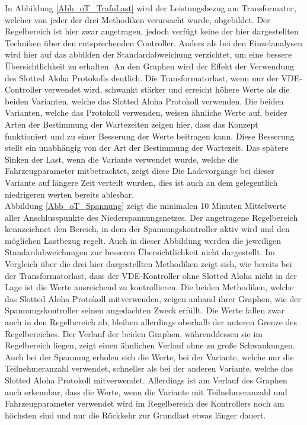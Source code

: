 In Abbildung \ref{Abb_oT_TrafoLast} wird der Leistungsbezug am Transformator, welcher von jeder der drei Methodiken verursacht wurde, abgebildet. Der Regelbereich ist hier zwar angetragen, jedoch verfügt keine der hier dargestellten Techniken über den entsprechenden Controller. Anders als bei den Einzelanalysen wird hier auf das abbilden der Standardabweichung verzichtet, um eine bessere Übersichtlichkeit zu erhalten. An den Graphen wird der Effekt der Verwendung des Slotted Aloha Protokolls deutlich. Die Transformatorlast, wenn nur der VDE-Controller verwendet wird, schwankt stärker und erreicht höhere Werte als die beiden Varianten, welche das Slotted Aloha Protokoll verwenden. Die beiden Varianten, welche das Protokoll verwenden, weisen ähnliche Werte auf, beider Arten der Bestimmung der Wartezeiten zeigen hier, dass das Konzept funktioniert und zu einer Besserung der Werte beitragen kann. Diese Besserung stellt ein unabhängig von der Art der Bestimmung der Wartezeit. Das spätere Sinken der Last, wenn die Variante verwendet wurde, welche die Fahrzeugparameter mitbetrachtet, zeigt diese Die Ladevorgänge bei dieser Variante auf längere Zeit verteilt wurden, dies ist auch an dem gelegentlich niedrigeren werten bereits ablesbar.\\
Abbildung \ref{Abb_oT_Spannung} zeigt die minimalen 10 Minuten Mittelwerte aller Anschlusspunkte des Niederspannungsnetzes. Der angetragene Regelbereich kennzeichnet den Bereich, in dem der Spannungskontroller aktiv wird und den möglichen Lastbezug regelt. Auch in dieser Abbildung werden die jeweiligen Standardabweichungen zur besseren Übersichtlichkeit nicht dargestellt. Im Vergleich über die drei hier dargestellten Methodiken zeigt sich, wie bereits bei der Transformatorlast, dass der VDE-Kontroller ohne Slotted Aloha nicht in der Lage ist die Werte ausreichend zu kontrollieren. Die beiden Methodiken, welche das Slotted Aloha Protokoll mitverwenden, zeigen anhand ihrer Graphen, wie der Spannungskontroller seinen angedachten Zweck erfüllt. Die Werte fallen zwar auch in den Regelbereich ab, bleiben allerdings oberhalb der unteren Grenze des Regelbereiches. Der Verlauf der beiden Graphen, währenddessen sie im Regelbereich liegen, zeigt einen ähnlichen Verlauf ohne zu große Schwankungen. Auch bei der Spannung erholen sich die Werte, bei der Variante, welche nur die Teilnehmeranzahl verwendet, schneller als bei der anderen Variante, welche das Slotted Aloha Protokoll mitverwendet. Allerdings ist am Verlauf des Graphen auch erkennbar, dass die Werte, wenn die Variante mit Teilnehmeranzahl und Fahrzeugparameter verwendet wird im Regelbereich des Kontrollers noch am höchsten sind und nur die Rückkehr zur Grundlast etwas länger dauert.
